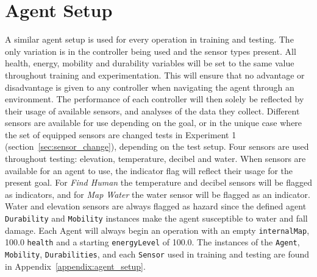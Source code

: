 \section{Agent Setup} \label{sec:agent_setups}
A similar agent setup is used for every operation in training and testing.
The only variation is in the controller being used and the sensor types present.
All health, energy, mobility and durability variables will be set to the same value throughout training and experimentation.
This will ensure that no advantage or disadvantage is given to any controller when navigating the agent through an environment.
The performance of each controller will then solely be reflected by their usage of available sensors, and analyses of the data they collect.
Different sensors are available for use depending on the goal, or in the unique case where the set of equipped sensors are changed tests in Experiment 1 (section~\ref{sec:sensor_change}), depending on the test setup.
Four sensors are used throughout testing: elevation, temperature, decibel and water.
When sensors are available for an agent to use, the indicator flag will reflect their usage for the present goal.
For \textit{Find Human} the temperature and decibel sensors will be flagged as indicators, and for \textit{Map Water} the water sensor will be flagged as an indicator.
Water and elevation sensors are always flagged as hazard since the defined agent \texttt{Durability} and \texttt{Mobility} instances make the agent susceptible to water and fall damage.
Each Agent will always begin an operation with an empty \texttt{internalMap}, 100.0 \texttt{health} and a starting \texttt{energyLevel} of 100.0.
The instances of the \texttt{Agent}, \texttt{Mobility}, \texttt{Durabilities}, and each \texttt{Sensor} used in training and testing are found in Appendix~\ref{appendix:agent_setup}.


